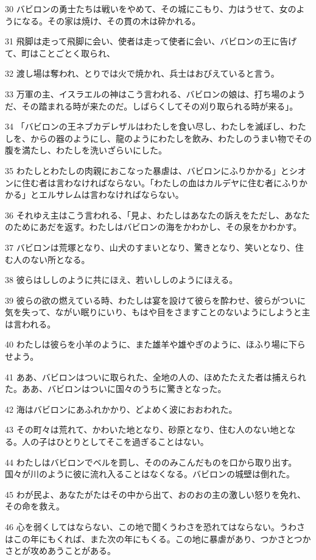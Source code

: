 \par 30 バビロンの勇士たちは戦いをやめて、その城にこもり、力はうせて、女のようになる。その家は焼け、その貫の木は砕かれる。
\par 31 飛脚は走って飛脚に会い、使者は走って使者に会い、バビロンの王に告げて、町はことごとく取られ、
\par 32 渡し場は奪われ、とりでは火で焼かれ、兵士はおびえていると言う。
\par 33 万軍の主、イスラエルの神はこう言われる、バビロンの娘は、打ち場のようだ、その踏まれる時が来たのだ。しばらくしてその刈り取られる時が来る」。
\par 34 「バビロンの王ネブカデレザルはわたしを食い尽し、わたしを滅ぼし、わたしを、からの器のようにし、龍のようにわたしを飲み、わたしのうまい物でその腹を満たし、わたしを洗いざらいにした。
\par 35 わたしとわたしの肉親におこなった暴虐は、バビロンにふりかかる」とシオンに住む者は言わなければならない。「わたしの血はカルデヤに住む者にふりかかる」とエルサレムは言わなければならない。
\par 36 それゆえ主はこう言われる、「見よ、わたしはあなたの訴えをただし、あなたのためにあだを返す。わたしはバビロンの海をかわかし、その泉をかわかす。
\par 37 バビロンは荒塚となり、山犬のすまいとなり、驚きとなり、笑いとなり、住む人のない所となる。
\par 38 彼らはししのように共にほえ、若いししのようにほえる。
\par 39 彼らの欲の燃えている時、わたしは宴を設けて彼らを酔わせ、彼らがついに気を失って、ながい眠りにいり、もはや目をさますことのないようにしようと主は言われる。
\par 40 わたしは彼らを小羊のように、また雄羊や雄やぎのように、ほふり場に下らせよう。
\par 41 ああ、バビロンはついに取られた、全地の人の、ほめたたえた者は捕えられた。ああ、バビロンはついに国々のうちに驚きとなった。
\par 42 海はバビロンにあふれかかり、どよめく波におおわれた。
\par 43 その町々は荒れて、かわいた地となり、砂原となり、住む人のない地となる。人の子はひとりとしてそこを過ぎることはない。
\par 44 わたしはバビロンでベルを罰し、そののみこんだものを口から取り出す。国々が川のように彼に流れ入ることはなくなる。バビロンの城壁は倒れた。
\par 45 わが民よ、あなたがたはその中から出て、おのおの主の激しい怒りを免れ、その命を救え。
\par 46 心を弱くしてはならない、この地で聞くうわさを恐れてはならない。うわさはこの年にもくれば、また次の年にもくる。この地に暴虐があり、つかさとつかさとが攻めあうことがある。
